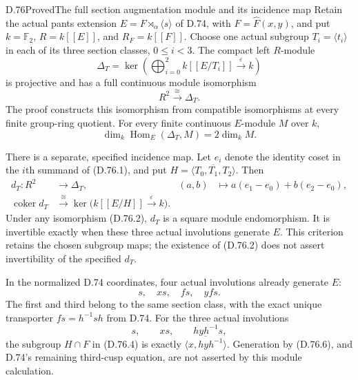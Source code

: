 \begin{claim}{D.76}{Proved}{The full section augmentation module and its incidence map}
Retain the actual pants extension $E=F\rtimes_\alpha\langle s\rangle$
of D.74, with $F=\widehat F(x,y)$, and put
$k=\mathbb F_2$, $R=k[[E]]$, and $R_F=k[[F]]$.
Choose one actual subgroup $T_i=\langle t_i\rangle$ in each
of its three section classes, $0\leq i<3$.
The compact left $R$-module
\[
 \Delta_T=\ker\left(
       \bigoplus_{i=0}^2 k[[E/T_i]]
                    \xrightarrow{\ \varepsilon\ }k\right)
                                                               \tag{D.76.1}
\]
is projective and has a full continuous module isomorphism
\[
                         R^2\xrightarrow{\ \cong\ }\Delta_T .
                                                               \tag{D.76.2}
\]
The proof constructs this isomorphism from compatible
isomorphisms at every finite group-ring quotient.
For every finite continuous $E$-module $M$ over $k$,
\[
             \dim_k\operatorname{Hom}_E(\Delta_T,M)
                                      =2\dim_k M.             \tag{D.76.3}
\]

There is a separate, specified incidence map.
Let $e_i$ denote the identity coset in the $i$th summand
of (D.76.1), and put
$H=\overline{\langle T_0,T_1,T_2\rangle}$.
Then
\[
 \begin{aligned}
 d_T:R^2&\longrightarrow\Delta_T,
       &(a,b)&\longmapsto a(e_1-e_0)+b(e_2-e_0),\\
 \operatorname{coker}d_T
       &\xrightarrow{\ \cong\ }
       \ker\bigl(k[[E/H]]\xrightarrow{\ \varepsilon\ }k\bigr).
 \end{aligned}                                                 \tag{D.76.4}
\]
Under any isomorphism (D.76.2), $d_T$ is a square
module endomorphism. It is invertible exactly when
these three actual involutions generate $E$.
This criterion retains the chosen subgroup maps;
the existence of (D.76.2) does not assert invertibility
of the specified $d_T$.

In the normalized D.74 coordinates, four actual
involutions already generate $E$:
\[
                        s,\quad xs,\quad fs,\quad yfs.
                                                               \tag{D.76.5}
\]
The first and third belong to the same section class,
with the exact unique transporter
$fs=h^{-1}sh$ from D.74.
For the three actual involutions
\[
                   s,\qquad xs,\qquad hyh^{-1}s,             \tag{D.76.6}
\]
the subgroup $H\cap F$ in (D.76.4) is exactly
$\overline{\langle x,hyh^{-1}\rangle}$.
Generation by (D.76.6), and D.74's remaining third-cusp
equation, are not asserted by this module calculation.
\end{claim}

